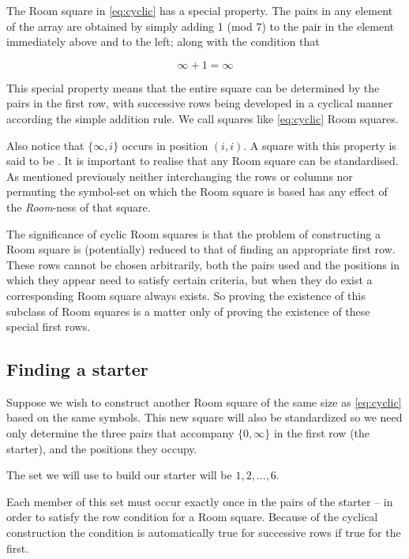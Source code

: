 The Room square in \eqref{eq:cyclic} has a special property.
The pairs in any element of the array are obtained by simply adding 1 (mod 7) to the pair in the element immediately above and to the left; along with the condition that

\begin{equation}
  \infty + 1 = \infty
\end{equation}

This special property means that the entire square can be determined by the pairs in the first row, with successive rows being developed in a cyclical manner according the simple addition rule.
We call squares like \eqref{eq:cyclic}  Room squares.

Also notice that $\{\infty,i\}$ occurs in position $(i,i)$.
A square with this property is said to be .
It is important to realise that any Room square can be standardised.
As mentioned previously neither interchanging the rows or columns nor permuting the symbol-set on which the Room square is based has any effect of the \emph{Room}-ness of that square.

The significance of cyclic Room squares is that the problem of constructing a Room square is (potentially) reduced to that of finding an appropriate first row.
These rows cannot be chosen arbitrarily, both the pairs used and the positions in which they appear need to satisfy certain criteria, but when they do exist a corresponding Room square always exists.
So proving the existence of this subclass of Room squares is a matter only of proving the existence of these special first rows.

\subsection{Finding a starter}

Suppose we wish to construct another Room square of the same size as \eqref{eq:cyclic} based on the same symbols.
This new square will also be standardized so we need only determine the three pairs that accompany $\{0, \infty\}$ in the first row (the starter), and the positions they occupy.

The set we will use to build our starter will be ${1, 2, \ldots, 6}$.

Each member of this set must occur exactly once in the pairs of the starter – in order to satisfy the row condition for a Room square.
Because of the cyclical construction the condition is automatically true for successive rows if true
for the first.


